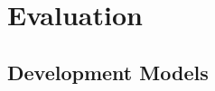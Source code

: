 \chapter{Evaluation} %
\label{cha:Evaluation}

\section{Development Models} %
\label{sec:Development Models}


